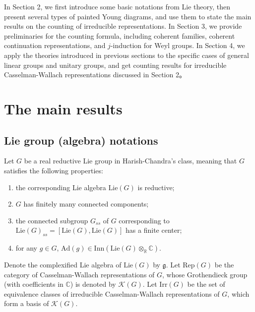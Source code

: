 \documentclass[12pt, a4paper]{amsart}
\numberwithin{equation}{section}
\newcommand{\BC}{{\mathbb {C}}}
\newcommand{\BR}{{\mathbb {R}}}
\newcommand{\CK}{{\mathcal {K}}}
\newcommand{\fg}{\mathfrak{g}}
\newcommand{\Irr}{{\mathrm{Irr}}}
\newcommand{\Inn}{{\mathrm{Inn}}}
\newcommand{\Ad}{{\mathrm{Ad}}}
\newcommand{\Lie}{{\mathrm{Lie}}}
\newcommand{\Rep}{{\mathrm{Rep}}}
\begin{document}
In Section 2, we first introduce some basic notations from Lie theory, then present several types of painted Young diagrams, and use them to state the main results on the counting of irreducible representations. In Section 3, we provide preliminaries for the counting formula, including coherent families, coherent continuation representations, and $j$-induction for Weyl groups. In Section 4, we apply the theories introduced in previous sections to the specific cases of general linear groups and unitary groups, and get counting results for irreducible Casselman-Wallach representations discussed in Section 2。

   













\section{The main results}


\subsection{Lie group (algebra) notations}
Let $G$ be a real reductive Lie group in Harish-Chandra's class, meaning that $G$ satisfies the following properties:
\begin{enumerate}
   \item the corresponding Lie algebra $\Lie (G)$ is reductive;
   \item $G$ has finitely many connected components;
   \item the connected subgroup $G_{ss}$ of $G$ corresponding to $\Lie(G)_{ss} = [\Lie(G),\Lie(G)]$ has a finite center;
   \item for any $g \in G$, $\Ad(g) \in \Inn(\Lie(G) \otimes_{\BR} \BC)$.
\end{enumerate}

Denote the complexified Lie algebra of $\Lie(G)$ by $\fg$. Let $\Rep(G)$ be the category of Casselman-Wallach representations of $G$, whose Grothendieck group (with coefficients in $\BC$) is denoted by $\CK(G)$. Let $\Irr (G)$ be the set of equivalence classes of irreducible Casselman-Wallach representations of $G$, which form a basis of $\CK(G)$.
\end{document}
